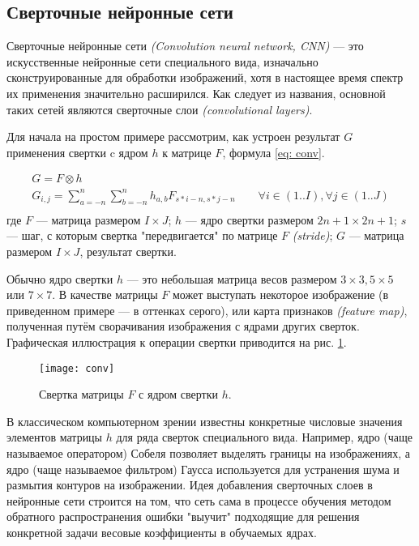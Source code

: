 \subsection{Сверточные нейронные сети}

\indent
\indent
Сверточные нейронные сети \textit{(Convolution neural network, CNN)} --- 
это искусственные нейронные сети специального вида,
изначально сконструированные для 
обработки изображений, хотя в настоящее время спектр их применения 
значительно расширился. Как следует из названия, основной таких сетей 
являются сверточные слои \textit{(convolutional layers)}.

\indent
\indent
 Для начала на простом примере рассмотрим,
 как устроен результат $G$ применения свертки c ядром $h$ 
 к матрице  $F$, формула \ref{eq: conv}. 

\begin{equation}\label{eq: conv}
    \begin{gathered}
        G = F \otimes h \\
	    G_{i, j} = \sum_{a=-n}^{n} \sum_{b=-n}^{n} h_{a, b} F_{s*i - n, s*j - n} \qquad
	    \forall i \in (1..I), \forall j \in (1..J) \\
    \end{gathered}
\end{equation}
где $F$ --- матрица размером $I \times J$;
$h$ --- ядро свертки размером $2n+1 \times 2n+1$;
$s$ --- шаг, с которым свертка "передвигается" по матрице $F$ \textit{(stride)};
$G$ --- матрица размером $I \times J$, результат свертки.

\indent
\indent
Обычно ядро свертки $h$ --- это небольшая матрица весов размером
 $3\times3, 5\times5$ или $7\times7$. В качестве матрицы $F$ может выступать
 некоторое изображение (в приведенном примере --- в оттенках серого),
  или карта признаков \textit{(feature map)}, полученная 
путём сворачивания изображения с ядрами других сверток.
Графическая иллюстрация
к операции свертки приводится на рис. \ref{tikzpicture: conv}.


\begin{figure}[h!]
    \begin{center}
   	    \texttt{[image: conv]}
   	\end{center}
   	\caption{Свертка матрицы $F$ с ядром свертки $h$.}
   	\label{tikzpicture: conv}
\end{figure}


\indent
\indent
В классическом компьютерном зрении известны конкретные числовые
значения элементов матрицы $h$ для ряда сверток 
специального вида. Например, ядро (чаще называемое оператором) Собеля 
позволяет выделять границы на изображениях, а ядро (чаще
называемое фильтром) Гаусса используется для устранения шума
и размытия контуров на изображении. Идея добавления сверточных слоев в 
 нейронные сети строится на том, что сеть сама в процессе
обучения методом обратного распространения ошибки "выучит" подходящие
для решения конкретной задачи весовые коэффициенты в обучаемых ядрах.

